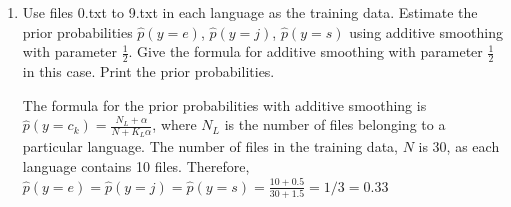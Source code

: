 \documentclass[a4paper]{article}
\theoremstyle{definition}
\newenvironment{soln}{
    \leavevmode\color{blue}\ignorespaces
}{}
\begin{document}
\begin{enumerate}
\item
Use files 0.txt to 9.txt in each language as the training data.
Estimate the prior probabilities 
$\hat p(y=e)$,
$\hat p(y=j)$,
$\hat p(y=s)$
using additive smoothing with parameter $\frac{1}{2}$. 
Give the formula for additive smoothing with parameter $\frac{1}{2}$ in this case. 
Print the prior probabilities.\\
\begin{soln}
The formula for the prior probabilities with additive smoothing is \\
$\hat p(y=c_k)=\frac{N_L + \alpha}{N+K_L\alpha}$, where $N_L$ is the number of files belonging to a particular language. The number of files in the training data, $N$ is 30, as each language contains 10 files. Therefore, \\ 
$\hat p(y=e)=\hat p(y=j)=\hat p(y=s)=\frac{10+0.5}{30+1.5}=1/3=0.33$
    

\end{soln}
\end{enumerate}
\end{document}
